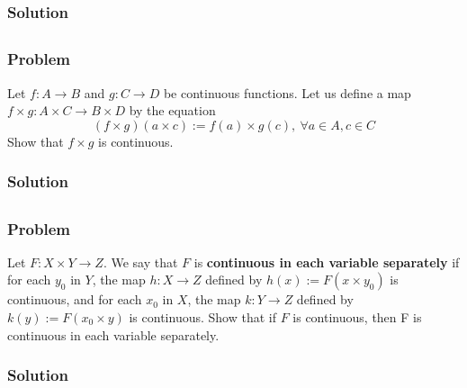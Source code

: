 \subsubsection{Solution}
\todo


\subsection{}

\subsubsection{Problem}
Let $f : A \to B$ and $g : C \to D$ be continuous functions. Let us define a map $f \times g : A \times C \to B \times D$ by the equation
\[ (f \times g)(a \times c) := f(a) \times g(c),~ \forall a \in A, c \in C \]
Show that $f \times g$ is continuous.

\subsubsection{Solution}
\todo


\subsection{}

\subsubsection{Problem}
Let $F : X \times Y \to Z$. We say that $F$ is \textbf{continuous in each variable separately} if for each $y_0$ in $Y$, the map $h : X \to Z$ defined by $h(x) := F(x \times y_0)$ is continuous, and for each $x_0$ in $X$, the map $k : Y \to Z$ defined by $k(y) := F(x_0 \times y)$ is continuous. Show that if $F$ is continuous, then F is continuous in each variable separately.

\subsubsection{Solution}
\todo


\subsection{}

